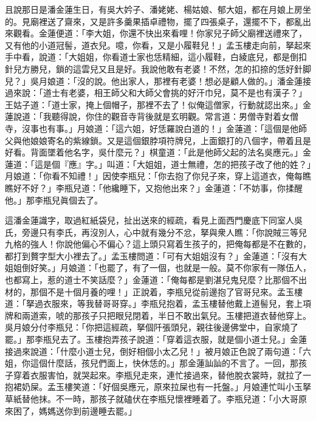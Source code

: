 且說那日是潘金蓮生日，有吳大妗子、潘姥姥、楊姑娘、郁大姐，都在月娘上房坐的。見廟裡送了齋來，又是許多羹果插卓禮物，擺了四張桌子，還擺不下，都亂出來觀看。金蓮便道：「李大姐，你還不快出來看哩！你家兒子師父廟裡送禮來了，又有他的小道冠髻，道衣兒。噫，{}你看，又是小履鞋兒！」孟玉樓走向前，拏起來手中看，說道：「大姐姐，你看道士家也恁精細，這小履鞋，白綾底兒，都是倒扣針兒方勝兒，鎖的這雲兒又且是好。我說他敢有老婆！不然，怎的扣捺的恁好針脚兒？」吳月娘道：「沒的說。他出家人，那裡有老婆！{}想必是顧人做的。」潘金蓮接過來說：「道士有老婆，相王師父和大師父會挑的好汗巾兒，莫不是也有漢子？」{}王姑子道：「道士家，掩上個帽子，那裡不去了！似俺這僧家，行動就認出來。」{}金蓮說道：「我聽得說，你住的觀音寺背後就是玄明觀。常言道：男僧寺對着女僧寺，沒事也有事。」月娘道：「這六姐，好恁羅說白道的！」金蓮道：「這個是他師父與他娘娘寄名的紫線鎖。又是這個銀脖項符牌兒，上面銀打的八個字，帶着且是好看。背面墜着他名字，吳什麼元？」棋童道：「此是他師父起的法名吳應元。」金蓮道：「這是個『應』字。」{}叫道：「大姐姐，道士無禮，怎的把孩子改了他的姓？」{}月娘道：「你看不知禮！」因使李瓶兒：「你去抱了你兒子來，穿上這道衣，俺每瞧瞧好不好？」李瓶兒道：「他纔睡下，又抱他出來？」金蓮道：「不妨事，你揉醒他。」那李瓶兒眞個去了。

這潘金蓮識字，取過紅紙袋兒，扯出送來的經疏，看見上面西門慶底下同室人吳氏，旁邊只有李氏，再沒別人，心中就有幾分不忿，拏與衆人瞧：「你說賊三等兒九格的強人！你說他偏心不偏心？這上頭只寫着生孩子的，把俺每都是不在數的，都打到贅字型大小裡去了。」孟玉樓問道：「可有大姐姐沒有？」金蓮道：「沒有大姐姐倒好笑。」{}{}月娘道：「也罷了，有了一個，也就是一般。莫不你家有一隊伍人，也都寫上，惹的道士不笑話麼？」金蓮道：「俺每都是劉湛兒鬼兒麼？比那個不出材的，那個不是十個月養的哩！」正說着，李瓶兒從前邊抱了官哥兒來。孟玉樓道：「拏過衣服來，等我替哥哥穿。」李瓶兒抱着，孟玉樓替他戴上道髻兒，套上項牌和兩道索，唬的那孩子只把眼兒閉着，半日不敢出氣兒。玉樓把道衣替他穿上。吳月娘分付李瓶兒：「你把這經疏，拏個阡張頭兒，親往後邊佛堂中，自家燒了罷。」那李瓶兒去了。玉樓抱弄孩子說道：「穿着這衣服，就是個小道士兒。」金蓮接過來說道：「什麼小道士兒，倒好相個小太乙兒！」被月娘正色說了兩句道：「六姐，你這個什麼話，孩兒們面上，快休恁的。」那金蓮訕訕的不言了。{}一回，那孩子穿着衣服害怕，就哭起來。李瓶兒走來，連忙接過來，替他脫衣裳時，就拉了一抱裙奶屎。孟玉樓笑道：「好個吳應元，原來拉屎也有一托盤。」月娘連忙叫小玉拏草紙替他抹。不一時，那孩子就磕伏在李瓶兒懷裡睡着了。李瓶兒道：「小大哥原來困了，媽媽送你到前邊睡去罷。」

